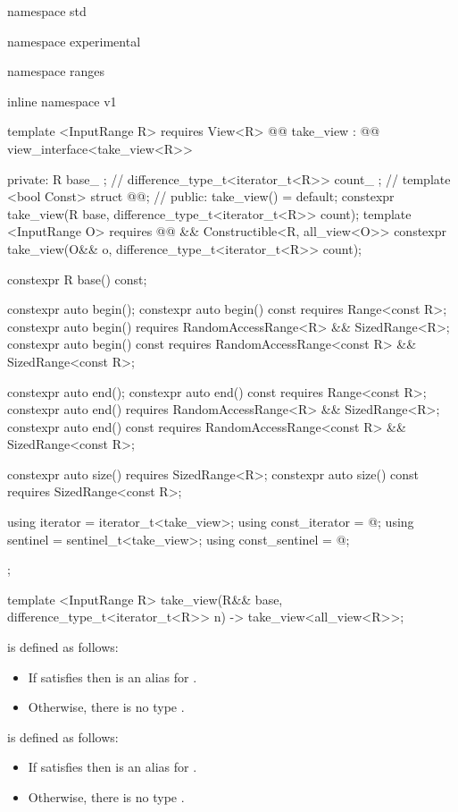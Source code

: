 \begin{codeblock}
namespace std { namespace experimental { namespace ranges { inline namespace v1 {
  template <InputRange R>
    requires View<R>
  @@ take_view : @@ view_interface<take_view<R>> {
  private:
    R base_ {}; // \expos
    difference_type_t<iterator_t<R>> count_ {}; // \expos
    template <bool Const>
      struct @@; // \expos
  public:
    take_view() = default;
    constexpr take_view(R base, difference_type_t<iterator_t<R>> count);
    template <InputRange O>
      requires @@ &&
          Constructible<R, all_view<O>>
    constexpr take_view(O&& o, difference_type_t<iterator_t<R>> count);

    constexpr R base() const;

    constexpr auto begin();
    constexpr auto begin() const requires Range<const R>;
    constexpr auto begin() requires RandomAccessRange<R> && SizedRange<R>;
    constexpr auto begin() const
      requires RandomAccessRange<const R> && SizedRange<const R>;

    constexpr auto end();
    constexpr auto end() const requires Range<const R>;
    constexpr auto end() requires RandomAccessRange<R> && SizedRange<R>;
    constexpr auto end() const
      requires RandomAccessRange<const R> && SizedRange<const R>;

    constexpr auto size() requires SizedRange<R>;
    constexpr auto size() const requires SizedRange<const R>;

    using iterator = iterator_t<take_view>;
    using const_iterator = @\seebelow@;
    using sentinel = sentinel_t<take_view>;
    using const_sentinel = @\seebelow@;
  };

  template <InputRange R>
  take_view(R&& base, difference_type_t<iterator_t<R>> n)
    -> take_view<all_view<R>>;
}}}}
\end{codeblock}

\pnum
{} is defined as follows:
\begin{itemize}
\item If  satisfies  then  is
an alias for .
\item Otherwise, there is no type .
\end{itemize}

\pnum
{} is defined as follows:
\begin{itemize}
\item If  satisfies  then  is
an alias for .
\item Otherwise, there is no type .
\end{itemize}

